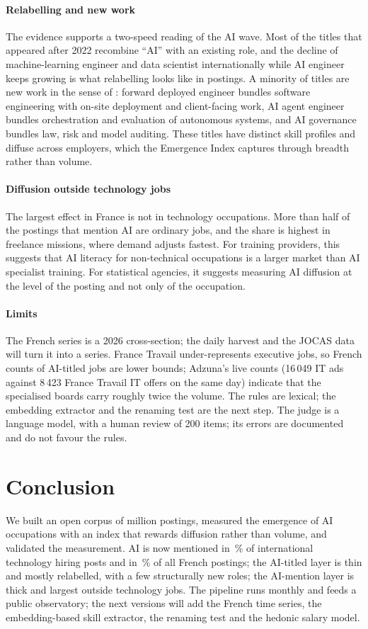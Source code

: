 \documentclass[5p,times,twocolumn,authoryear]{elsarticle}
\begin{document}
\paragraph{Relabelling and new work} The evidence supports a two-speed reading of the AI wave. Most of the titles that appeared after 2022 recombine ``AI'' with an existing role, and the decline of machine-learning engineer and data scientist internationally while AI engineer keeps growing is what relabelling looks like in postings. A minority of titles are new work in the sense of \citet{autor2024}: forward deployed engineer bundles software engineering with on-site deployment and client-facing work, AI agent engineer bundles orchestration and evaluation of autonomous systems, and AI governance bundles law, risk and model auditing. These titles have distinct skill profiles and diffuse across employers, which the Emergence Index captures through breadth rather than volume.

\paragraph{Diffusion outside technology jobs} The largest effect in France is not in technology occupations. More than half of the postings that mention AI are ordinary jobs, and the share is highest in freelance missions, where demand adjusts fastest. For training providers, this suggests that AI literacy for non-technical occupations is a larger market than AI specialist training. For statistical agencies, it suggests measuring AI diffusion at the level of the posting and not only of the occupation.

\paragraph{Limits} The French series is a 2026 cross-section; the daily harvest and the JOCAS data will turn it into a series. France Travail under-represents executive jobs, so French counts of AI-titled jobs are lower bounds; Adzuna's live counts (16\,049 IT ads against 8\,423 France Travail IT offers on the same day) indicate that the specialised boards carry roughly twice the volume. The rules are lexical; the embedding extractor and the renaming test are the next step. The judge is a language model, with a human review of 200 items; its errors are documented and do not favour the rules.

\section{Conclusion}\label{sec:concl}
We built an open corpus of \nAll{} million postings, measured the emergence of AI occupations with an index that rewards diffusion rather than volume, and validated the measurement. AI is now mentioned in \hnAIlast\,\% of international technology hiring posts and in \pAI\,\% of all French postings; the AI-titled layer is thin and mostly relabelled, with a few structurally new roles; the AI-mention layer is thick and largest outside technology jobs. The pipeline runs monthly and feeds a public observatory; the next versions will add the French time series, the embedding-based skill extractor, the renaming test and the hedonic salary model.
\end{document}
